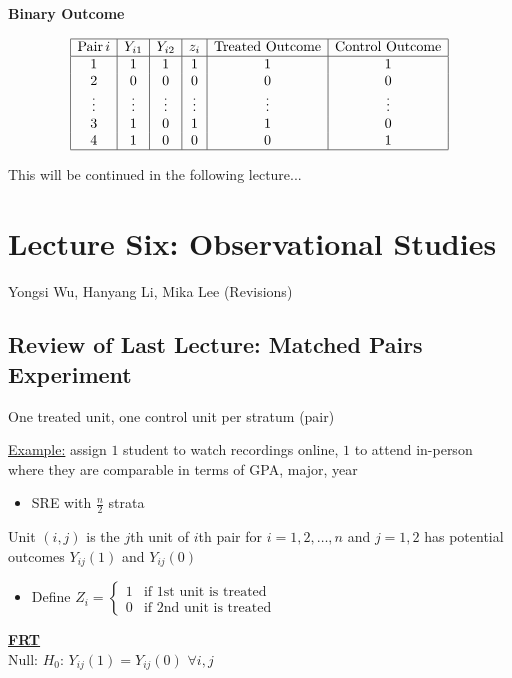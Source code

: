\textbf{Binary Outcome}

\[
\begin{array}{|c|c|c|c|c|c|}
\hline
\text{Pair} \, i & Y_{i1} & Y_{i2} & z_i & \text{Treated Outcome} & \text{Control Outcome} \\
\hline
1 & 1 & 1 & 1 & 1 & 1 \\
2 & 0 & 0 & 0 & 0 & 0 \\
\vdots & \vdots & \vdots & \vdots & \vdots & \vdots \\
3 & 1 & 0 & 1 & 1 & 0 \\
4 & 1 & 0 & 0 & 0 & 1 \\
\hline
\end{array}
\]

This will be continued in the following lecture...


\section{Lecture Six: Observational Studies}{Yongsi Wu, Hanyang Li, Mika Lee (Revisions)}

\subsection{Review of Last Lecture: Matched Pairs Experiment}

One treated unit, one control unit per stratum (pair)

\underline{Example:} assign $1$ student to watch recordings online, $1$ to attend in-person where they are comparable in terms of GPA, major, year

\begin{itemize}
    \item SRE with $\frac{n}{2}$ strata
\end{itemize}
Unit $(i, j)$ is the $j$th unit of $i$th pair for $i = 1, 2, \dots, n$ and $j = 1, 2$ has potential outcomes $Y_{ij}(1)$ and $Y_{ij}(0)$

\begin{itemize}
    \item Define
        $Z_i = \left\{\begin{array}{rl}
        1 & \text{if $1$st unit is treated}\\
        0 & \text{if $2$nd unit is treated}
        \end{array}\right.$
\end{itemize}

\underline{\textbf{FRT}}\\
Null: $H_0$: $Y_{ij}(1) = Y_{ij}(0)$ $\forall i,j$

